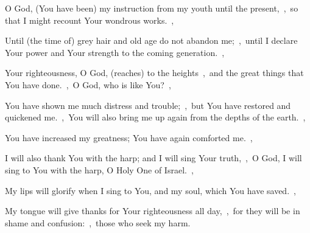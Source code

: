 \documentclass[12pt,twoside,a5paper]{article}
\begin{document}
\begin{normalparskip}
  O God, (You have been) my instruction from my youth until the present,~\sep\ so that I might recount Your wondrous works.~\sep

  Until (the time of) grey hair and old age do not abandon me;~\sep\ until I declare Your power and Your strength to the coming generation.~\sep

  Your righteousness, O God, (reaches) to the heights~\sep\ and the great things that You have done.~\sep\ O God, who is like You?~\sep

  You have shown me much distress and trouble;~\sep\ but You have restored and quickened me.~\sep\ You will also bring me up again from the depths of the earth.~\sep

  You have increased my greatness; You have again comforted me.~\sep

  I will also thank You with the harp; and I will sing Your truth,~\sep\ O God, I will sing to You with the harp, O Holy One of Israel.~\sep

  My lips will glorify when I sing to You, and my soul, which You have saved.~\sep

  My tongue will give thanks for Your righteousness all day,~\sep\ for they will be in shame and confusion:~\sep\ those who seek my harm.
\end{normalparskip}

\end{document}
